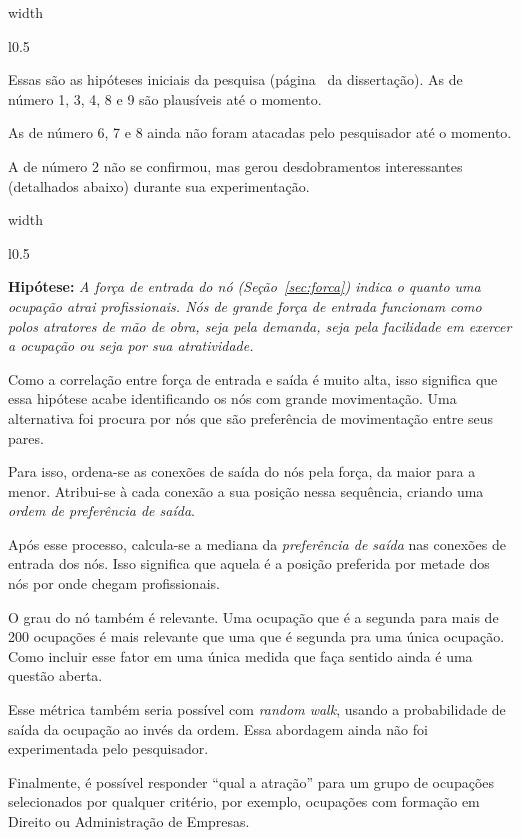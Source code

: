\documentclass[10pt,a4paper,final]{article}
\newcommand\disappearingrule{%
  \par %
  \vskip10pt %
  \leaders\vrule width \textwidth\vskip0.4pt %
  \nointerlineskip %
  \vskip10pt %
}
\begin{document}
\disappearingrule

\begin{minipage}[t][18\baselineskip]{\linewidth}
  \begin{wrapfigure}{l}{0.5\textwidth}
    \label{sde:hipoteses}
  \end{wrapfigure}
  
  Essas são as hipóteses iniciais da pesquisa (página~\pageref{sec:resultados-preliminares} da dissertação). As de número 1, 3, 4, 8 e 9 são plausíveis até o momento.
  
  As de número 6, 7 e 8 ainda não foram atacadas pelo pesquisador até o momento.
  
  A de número 2 não se confirmou, mas gerou desdobramentos interessantes (detalhados abaixo) durante sua experimentação.
\end{minipage}

\disappearingrule

\begin{minipage}[t]{\linewidth}
  \begin{wrapfigure}{l}{0.5\textwidth}
  \end{wrapfigure}
  
  \textbf{Hipótese:} \textit{A força de entrada do nó (Seção~\ref{sec:forca}) indica o quanto uma ocupação atrai profissionais. Nós de grande força de entrada funcionam como polos atratores de mão de obra, seja pela demanda, seja pela facilidade em exercer a ocupação ou seja por sua atratividade.}
  
  Como a correlação entre força de entrada e saída é muito alta, isso significa que essa hipótese acabe identificando os nós com grande movimentação. Uma alternativa foi procura por nós que são preferência de movimentação entre seus pares.

  Para isso, ordena-se as conexões de saída do nós pela força, da maior para a menor. Atribui-se à cada conexão a sua posição nessa sequência, criando uma \textit{ordem de preferência de saída}.
  
  Após esse processo, calcula-se a mediana da \textit{preferência de saída} nas conexões de entrada dos nós. Isso significa que aquela é a posição preferida por metade dos nós por onde chegam profissionais.
  
  O grau do nó também é relevante. Uma ocupação que é a segunda para mais de 200 ocupações é mais relevante que uma que é segunda pra uma única ocupação. Como incluir esse fator em uma única medida que faça sentido ainda é uma questão aberta.
  
  Esse métrica também seria possível com \textit{random walk}, usando a probabilidade de saída da ocupação ao invés da ordem. Essa abordagem ainda não foi experimentada pelo pesquisador.
  
  Finalmente, é possível responder \enquote{qual a atração} para um grupo de ocupações selecionados por qualquer critério, por exemplo, ocupações com formação em Direito ou Administração de Empresas.
\end{minipage}
\end{document}

